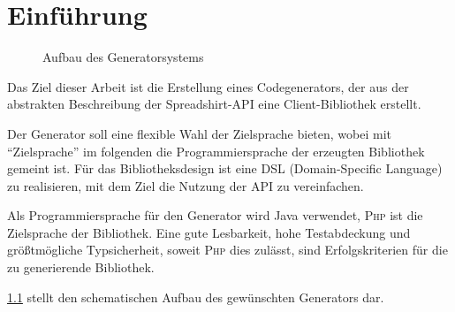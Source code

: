  \chapter{Einführung}
\label{chap:introduction}


\begin{figure}[b]
    \centering
    \resizebox{\textwidth}{!}{
        
    }
    \caption{Aufbau des Generatorsystems}
    \label{fig:generatorstructure}
\end{figure}        

Das Ziel dieser Arbeit ist die Erstellung eines Codegenerators, der aus der abstrakten Beschreibung der Spreadshirt-\gls{API} eine Client-Bibliothek erstellt.

Der Generator soll eine flexible Wahl der Zielsprache bieten, wobei mit \enquote{Zielsprache} im folgenden die Programmiersprache der erzeugten Bibliothek gemeint ist. 
Für das Bibliotheksdesign ist eine \gls{DSL} (Domain-Specific Language) zu realisieren, mit dem Ziel die Nutzung der \gls{API} zu vereinfachen. 

Als Programmiersprache für den Generator wird Java verwendet, \textsc{Php} ist die Zielsprache der Bibliothek.
Eine gute Lesbarkeit, hohe Testabdeckung und größtmögliche Typsicherheit, soweit \textsc{Php} dies zulässt, sind Erfolgskriterien für die zu generierende Bibliothek.

\cref{fig:generatorstructure} stellt den schematischen Aufbau des gewünschten Generators dar.





